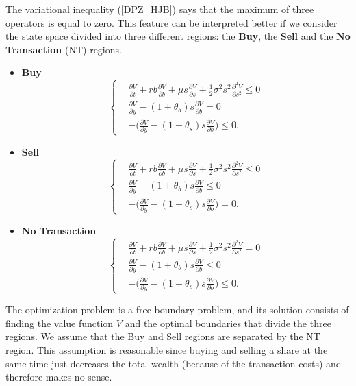 \noindent
The variational inequality (\ref{DPZ_HJB}) says that the maximum of three operators is equal to zero.
This feature can be interpreted better if we consider the state space divided into three different regions: the \textbf{Buy}, the \textbf{Sell}
and the \textbf{No Transaction} (NT) regions.
\begin{itemize}
 \item \textbf{Buy}
  \begin{equation*}
   \begin{cases}
     & \frac{\partial V}{\partial t} + rb\frac{\partial V}{\partial b} + \mu s \frac{\partial V}{\partial s} + \frac{1}{2}\sigma^2 s^2 \frac{\partial^2 V}{\partial s^2} \leq 0\\ 
     & \frac{\partial V}{\partial y}-(1+\theta_b) s \frac{\partial V}{\partial b} = 0 \\
     & -\biggl(\frac{\partial V}{\partial y}-(1-\theta_s)s \frac{\partial V}{\partial b} \biggr) \leq 0.
   \end{cases}
  \end{equation*}
 \item \textbf{Sell}
  \begin{equation*}
   \begin{cases}
     & \frac{\partial V}{\partial t} + rb\frac{\partial V}{\partial b} + \mu s \frac{\partial V}{\partial s} + \frac{1}{2}\sigma^2 s^2 \frac{\partial^2 V}{\partial s^2} \leq 0 \\ 
     & \frac{\partial V}{\partial y}-(1+\theta_b) s \frac{\partial V}{\partial b} \leq 0 \\
     & -\biggl(\frac{\partial V}{\partial y}-(1-\theta_s)s \frac{\partial V}{\partial b} \biggr) = 0.
   \end{cases}
  \end{equation*}
 \item \textbf{No Transaction}
  \begin{equation*}
   \begin{cases}
     & \frac{\partial V}{\partial t} + rb\frac{\partial V}{\partial b} + \mu s \frac{\partial V}{\partial s} + \frac{1}{2}\sigma^2 s^2 \frac{\partial^2 V}{\partial s^2} = 0 \\ 
     & \frac{\partial V}{\partial y}-(1+\theta_b) s \frac{\partial V}{\partial b} \leq 0 \\
     & -\biggl(\frac{\partial V}{\partial y}-(1-\theta_s)s \frac{\partial V}{\partial b} \biggr) \leq 0.
   \end{cases}
  \end{equation*}
\end{itemize}
The optimization problem is a free boundary problem, and its solution consists of finding the value function $V$ and the 
optimal boundaries that divide the three regions.
We assume that the Buy and Sell regions are separated by the NT region. This assumption is reasonable since buying and selling a share at the same time just decreases the 
total wealth (because of the transaction costs) and therefore makes no sense. 

